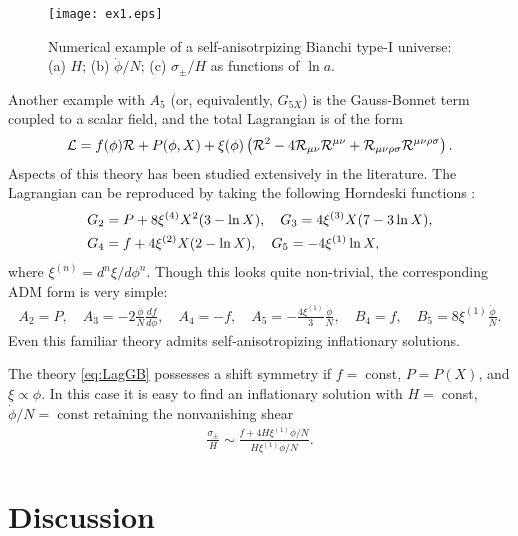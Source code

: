 \documentclass[aps,prd,preprint,superscriptaddress,nofootinbib,tightenlines]{revtex4-1}
\begin{document}
\begin{figure}[htbp]
  \begin{center}
       \texttt{[image: ex1.eps]}
       \caption{
       Numerical example of a self-anisotrpizing Bianchi type-I universe:
       (a) $H$; (b) $\dot\phi/N$; (c) $\sigma_\pm/H$ as functions of $\ln a$.}
       \label{fig:ex1}
  \end{center}
\end{figure}



Another example with $A_5$ (or, equivalently, $G_{5X}$)
is the Gauss-Bonnet term coupled to a scalar field,
and the total Lagrangian is of the form
\begin{align}
{\cal L}=f(\phi){\cal R}+P(\phi, X)+\xi(\phi)
\left({\cal R}^2-4{\cal R}_{\mu\nu}{\cal R}^{\mu\nu}
+{\cal R}_{\mu\nu\rho\sigma}{\cal R}^{\mu\nu\rho\sigma}\right).
\label{eq:LagGB}
\end{align}
Aspects of
this theory has been studied extensively in the literature.
The Lagrangian can be reproduced by taking the following
Horndeski functions \cite{Kobayashi:2011nu}:
\begin{align}
&
G_2=P+8\xi^{(4)}X^2(3-\ln X),\quad G_3=4\xi^{(3)}X(7-3\ln X),
\notag \\
&G_4=f+4\xi^{(2)}X(2-\ln X),
\quad
G_5=-4\xi^{(1)}\ln X,
\end{align}
where $\xi^{(n)}=d^n\xi/d\phi^n$. Though this looks quite non-trivial,
the corresponding ADM form is very simple:
\begin{align}
A_2=P,\quad  A_3=-2\frac{\dot\phi}{N}\frac{d f}{d\phi},
\quad A_4=-f,\quad A_5=-\frac{4\xi^{(1)}}{3}\frac{\dot\phi}{N},
\quad B_4=f,\quad B_5=8\xi^{(1)}\frac{\dot\phi}{N}.
\end{align}
Even this familiar theory admits self-anisotropizing inflationary solutions.


The theory \eqref{eq:LagGB} possesses a shift symmetry
if $f=\;$const, $P=P(X)$, and $\xi\propto \phi$.
In this case it is easy to find an inflationary solution
with $H=\;$const, $\dot\phi/N=\;$const retaining
the nonvanishing shear
\begin{align}
\frac{\sigma_\pm}{H}\sim \frac{f+4H\xi^{(1)}\dot\phi/N}{H\xi^{(1)}\dot\phi/N}.
\end{align}




\section{Discussion}\label{discussion}
\end{document}
